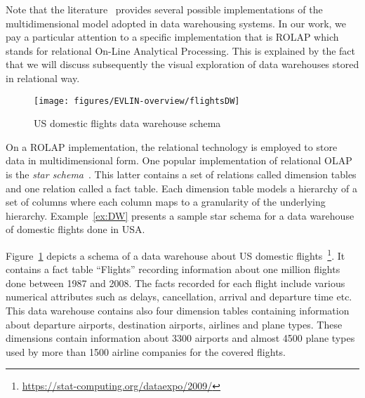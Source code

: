 
Note that the literature~\cite{Vassiliadis:99} provides several possible implementations of the multidimensional model adopted in data warehousing systems. In our work,  we pay a particular attention to a specific implementation that is ROLAP which stands for relational On-Line Analytical Processing.
This is explained by the fact that we will discuss subsequently the visual exploration of data warehouses stored in relational way.

\begin{figure}[t]
\centering
\texttt{[image: figures/EVLIN-overview/flightsDW]}
\caption{US domestic flights data warehouse schema}
\label{fig:flights-DW}
\end{figure}

\sloppy
On a ROLAP implementation, the relational technology is employed to store data in multidimensional form. 
One popular implementation of relational OLAP is the \emph{star schema}~\cite{Kimball96}. This latter contains  a set of relations called dimension tables and one relation called a fact table. Each dimension table models a hierarchy of a set of columns where each column maps to a granularity of the underlying hierarchy. 
Example~\ref{ex:DW} presents a sample star schema for a data warehouse of domestic flights done in USA.


\begin{example}
\label{ex:DW}
Figure~\ref{fig:flights-DW} depicts a schema of a data warehouse about US domestic flights~\footnote{\url{https://stat-computing.org/dataexpo/2009/}}. 
It contains a fact table ``Flights'' recording information about one million flights done between 1987 and 2008. The facts recorded for each flight include various numerical attributes such as delays, cancellation, arrival and departure time etc. This data warehouse contains also four dimension tables 
containing information about departure airports, destination airports, airlines and plane types. These dimensions contain information about 3300 airports and almost 4500 plane types used by more than 1500 airline companies for the covered flights. 
\end{example}


